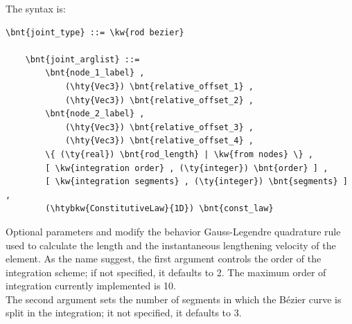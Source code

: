 The syntax is:
\begin{Verbatim}[commandchars=\\\{\}]
	\bnt{joint_type} ::= \kw{rod bezier}

	\bnt{joint_arglist} ::=
		\bnt{node_1_label} ,
			(\hty{Vec3}) \bnt{relative_offset_1} ,
			(\hty{Vec3}) \bnt{relative_offset_2} ,
		\bnt{node_2_label} ,
			(\hty{Vec3}) \bnt{relative_offset_3} ,
			(\hty{Vec3}) \bnt{relative_offset_4} ,
		\{ (\ty{real}) \bnt{rod_length} | \kw{from nodes} \} ,
		[ \kw{integration order} , (\ty{integer}) \bnt{order} ] ,
		[ \kw{integration segments} , (\ty{integer}) \bnt{segments} ] ,
        (\htybkw{ConstitutiveLaw}{1D}) \bnt{const_law}
\end{Verbatim}
Optional parameters  and 
modify the behavior Gauss-Legendre quadrature rule used to 
calculate the length and the instantaneous lengthening velocity of the
element. As the name suggest, the first argument controls the order of
the integration scheme; if not specified, it defaults to 2. The maximum
order of integration currently implemented is 10. \\
The second argument sets the number of segments in which the B\'ezier curve
is split in the integration; it not specified, it defaults to 3.


